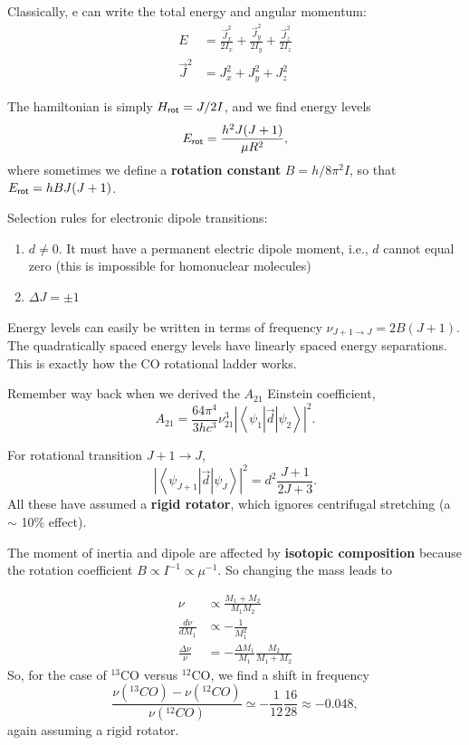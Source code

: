 \documentclass{tufte-handout}
\renewcommand{\textbf}[1]{{\bf \textcolor{dark-gray}{#1}}}
\renewcommand{\rm}{\sf}
\newcommand{\ev}[1]{\left\langle  {#1} \right \rangle} %
\begin{document}
Classically, e can write the total energy and angular momentum:
\begin{align}
E &= \frac{\vec J_x^2}{2I_x} + \frac{\vec J_y^2}{2I_y} + \frac{\vec J_z^2}{2I_z}\\
\vec J^2 &= J_x^2 + J_y^2 + J_z^2
\end{align}

The hamiltonian is simply $H_{\rm rot} = J / 2I$, and we find energy levels
\begin{equation}
E_{\rm rot} = \frac{h^2 J(J+1)}{\mu R^2},
\end{equation}
where sometimes we define a \textbf{rotation constant} $B = h/8\pi^2 I$, so that $E_{\rm rot} = h B J(J+1)$.

Selection rules for electronic dipole transitions:
\begin{enumerate}
\item $d \neq 0$. It must have a permanent electric dipole moment, i.e., $d$ cannot equal zero (this is impossible for homonuclear molecules)
\item $\Delta J = \pm 1$
\end{enumerate}

Energy levels can easily be written in terms of frequency $\nu_{J+1 \rightarrow J} = 2B(J+1)$. The quadratically spaced energy levels have linearly spaced energy separations. This is exactly how the CO rotational ladder works.

Remember way back when we derived the $A_{21}$ Einstein coefficient,
\[A_{21} = \frac{64 \pi^4}{3hc^3} \nu_{21}^3 \left |\ev{\psi_1|\vec d | \psi_2}\right |^2.\]

For rotational transition $J+1 \rightarrow J$, 
\[\left |\ev{\psi_{J+1}|\vec d | \psi_J}\right |^2 = d^2 \frac{J+1}{2 J + 3}.\]
All these have assumed a \textbf{rigid rotator}, which ignores centrifugal stretching (a $\sim$ 10\% effect).

The moment of inertia and dipole are affected by \textbf{isotopic composition} because the rotation coefficient $B \propto I^{-1} \propto \mu^{-1}$. So changing the mass leads to

\begin{align*}
\nu &\propto \frac{M_1 + M_2}{M_1 M_2}\\
\frac{d\nu}{dM_1} &\propto -\frac{1}{M_1^2}\\
\frac{\Delta \nu}{\nu} &= -\frac{\Delta M_1}{M_1} \frac{M_2}{M_1 + M_2}
\end{align*}
So, for the case of $^{13}$CO versus $^{12}$CO, we find a shift in frequency
\[\frac{\nu(^{13}CO) - \nu(^{12}CO)}{\nu(^{12}CO)} \simeq -\frac{1}{12} \frac{16}{28} \approx -0.048,\]
again assuming a rigid rotator.
\end{document}
